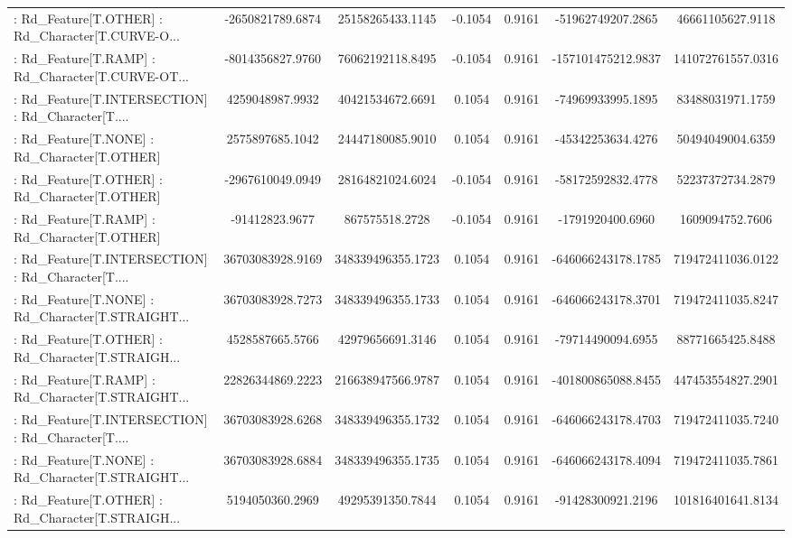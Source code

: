 \begin{longtable}{p{4cm}cccccc}
 : Rd\_Feature[T.OTHER] : Rd\_Character[T.CURVE-O... &  -2650821789.6874 &  25158265433.1145 & -0.1054 &       0.9161 &  -51962749207.2865 &  46661105627.9118 \\
 : Rd\_Feature[T.RAMP] : Rd\_Character[T.CURVE-OT... &  -8014356827.9760 &  76062192118.8495 & -0.1054 &       0.9161 & -157101475212.9837 & 141072761557.0316 \\
 : Rd\_Feature[T.INTERSECTION] : Rd\_Character[T.... &   4259048987.9932 &  40421534672.6691 &  0.1054 &       0.9161 &  -74969933995.1895 &  83488031971.1759 \\
 : Rd\_Feature[T.NONE] : Rd\_Character[T.OTHER]      &   2575897685.1042 &  24447180085.9010 &  0.1054 &       0.9161 &  -45342253634.4276 &  50494049004.6359 \\
 : Rd\_Feature[T.OTHER] : Rd\_Character[T.OTHER]     &  -2967610049.0949 &  28164821024.6024 & -0.1054 &       0.9161 &  -58172592832.4778 &  52237372734.2879 \\
 : Rd\_Feature[T.RAMP] : Rd\_Character[T.OTHER]      &    -91412823.9677 &    867575518.2728 & -0.1054 &       0.9161 &   -1791920400.6960 &   1609094752.7606 \\
 : Rd\_Feature[T.INTERSECTION] : Rd\_Character[T.... &  36703083928.9169 & 348339496355.1723 &  0.1054 &       0.9161 & -646066243178.1785 & 719472411036.0122 \\
 : Rd\_Feature[T.NONE] : Rd\_Character[T.STRAIGHT... &  36703083928.7273 & 348339496355.1733 &  0.1054 &       0.9161 & -646066243178.3701 & 719472411035.8247 \\
 : Rd\_Feature[T.OTHER] : Rd\_Character[T.STRAIGH... &   4528587665.5766 &  42979656691.3146 &  0.1054 &       0.9161 &  -79714490094.6955 &  88771665425.8488 \\
 : Rd\_Feature[T.RAMP] : Rd\_Character[T.STRAIGHT... &  22826344869.2223 & 216638947566.9787 &  0.1054 &       0.9161 & -401800865088.8455 & 447453554827.2901 \\
 : Rd\_Feature[T.INTERSECTION] : Rd\_Character[T.... &  36703083928.6268 & 348339496355.1732 &  0.1054 &       0.9161 & -646066243178.4703 & 719472411035.7240 \\
 : Rd\_Feature[T.NONE] : Rd\_Character[T.STRAIGHT... &  36703083928.6884 & 348339496355.1735 &  0.1054 &       0.9161 & -646066243178.4094 & 719472411035.7861 \\
 : Rd\_Feature[T.OTHER] : Rd\_Character[T.STRAIGH... &   5194050360.2969 &  49295391350.7844 &  0.1054 &       0.9161 &  -91428300921.2196 & 101816401641.8134 \\

\end{longtable}
